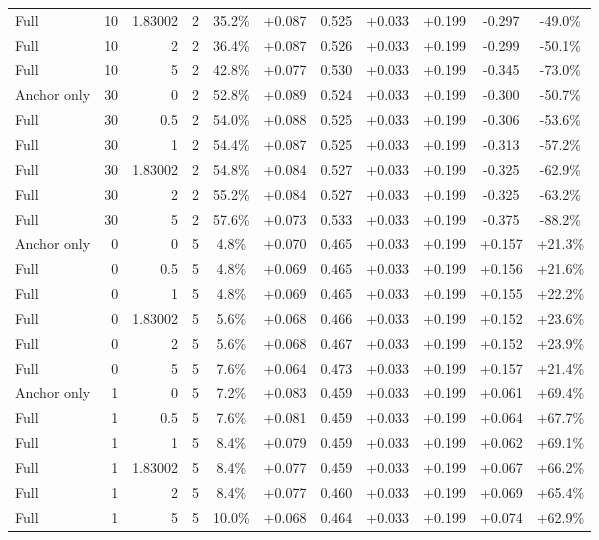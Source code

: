 \begin{table}[htbp]
\begin{tabular}{lrrrccccccc}
Full & 10 & 1.83002 & 2 & 35.2\% & +0.087 & 0.525 & +0.033 & +0.199 & -0.297 & -49.0\% \\
Full & 10 & 2 & 2 & 36.4\% & +0.087 & 0.526 & +0.033 & +0.199 & -0.299 & -50.1\% \\
Full & 10 & 5 & 2 & 42.8\% & +0.077 & 0.530 & +0.033 & +0.199 & -0.345 & -73.0\% \\
Anchor only & 30 & 0 & 2 & 52.8\% & +0.089 & 0.524 & +0.033 & +0.199 & -0.300 & -50.7\% \\
Full & 30 & 0.5 & 2 & 54.0\% & +0.088 & 0.525 & +0.033 & +0.199 & -0.306 & -53.6\% \\
Full & 30 & 1 & 2 & 54.4\% & +0.087 & 0.525 & +0.033 & +0.199 & -0.313 & -57.2\% \\
Full & 30 & 1.83002 & 2 & 54.8\% & +0.084 & 0.527 & +0.033 & +0.199 & -0.325 & -62.9\% \\
Full & 30 & 2 & 2 & 55.2\% & +0.084 & 0.527 & +0.033 & +0.199 & -0.325 & -63.2\% \\
Full & 30 & 5 & 2 & 57.6\% & +0.073 & 0.533 & +0.033 & +0.199 & -0.375 & -88.2\% \\
Anchor only & 0 & 0 & 5 & 4.8\% & +0.070 & 0.465 & +0.033 & +0.199 & +0.157 & +21.3\% \\
Full & 0 & 0.5 & 5 & 4.8\% & +0.069 & 0.465 & +0.033 & +0.199 & +0.156 & +21.6\% \\
Full & 0 & 1 & 5 & 4.8\% & +0.069 & 0.465 & +0.033 & +0.199 & +0.155 & +22.2\% \\
Full & 0 & 1.83002 & 5 & 5.6\% & +0.068 & 0.466 & +0.033 & +0.199 & +0.152 & +23.6\% \\
Full & 0 & 2 & 5 & 5.6\% & +0.068 & 0.467 & +0.033 & +0.199 & +0.152 & +23.9\% \\
Full & 0 & 5 & 5 & 7.6\% & +0.064 & 0.473 & +0.033 & +0.199 & +0.157 & +21.4\% \\
Anchor only & 1 & 0 & 5 & 7.2\% & +0.083 & 0.459 & +0.033 & +0.199 & +0.061 & +69.4\% \\
Full & 1 & 0.5 & 5 & 7.6\% & +0.081 & 0.459 & +0.033 & +0.199 & +0.064 & +67.7\% \\
Full & 1 & 1 & 5 & 8.4\% & +0.079 & 0.459 & +0.033 & +0.199 & +0.062 & +69.1\% \\
Full & 1 & 1.83002 & 5 & 8.4\% & +0.077 & 0.459 & +0.033 & +0.199 & +0.067 & +66.2\% \\
Full & 1 & 2 & 5 & 8.4\% & +0.077 & 0.460 & +0.033 & +0.199 & +0.069 & +65.4\% \\
Full & 1 & 5 & 5 & 10.0\% & +0.068 & 0.464 & +0.033 & +0.199 & +0.074 & +62.9\% \\

\end{tabular}
\end{table}
